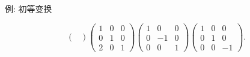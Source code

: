 \begin{frame}{例: 初等变换}
\begin{solution}
{\[\begin{pmatrix}
		\end{pmatrix}\begin{pmatrix}
			1&0&0\\0&1&0\\2&0&1
		\end{pmatrix}\begin{pmatrix}
			1&0&0\\0&-1&0\\0&0&1
		\end{pmatrix}\begin{pmatrix}
			1&0&0\\0&1&0\\0&0&-1
		\end{pmatrix}.\]}
		\vspace{-.3\baselineskip}
	\end{solution}
	\endgroup
\end{frame}
